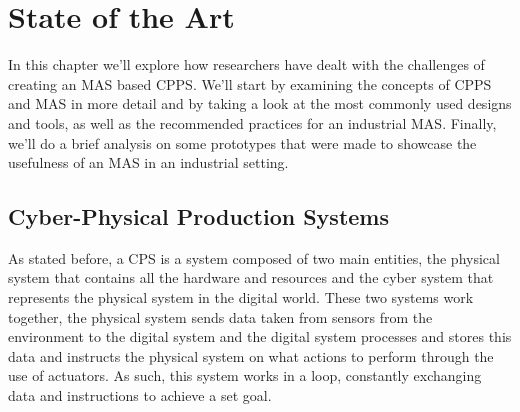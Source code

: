 

\glsresetall

\chapter{State of the Art}
\label{cha:state-of-the-art}

In this chapter we'll explore how researchers have dealt with the challenges of creating an \gls{MAS} based \gls{CPPS}. We'll start by  examining the concepts of \gls{CPPS} and \gls{MAS} in more detail and by taking a look at the most commonly used designs and tools, as well as the recommended practices for an industrial \gls{MAS}. Finally, we'll do a brief analysis on some prototypes that were made to showcase the usefulness of an \gls{MAS} in an industrial setting.

\section{Cyber-Physical Production Systems}
\label{sec:cyber-physical_production_systems}

As stated before, a \Gls{CPS} is a system composed of two main entities, the physical system that contains all the hardware and resources and the cyber system that represents the physical system in the digital world. These two systems work together, the physical system sends data taken from sensors from the environment to the digital system and the digital system processes and stores this data and instructs the physical system on what actions to perform through the use of actuators. As such, this system works in a loop, constantly exchanging data and instructions to achieve a set goal.\\


